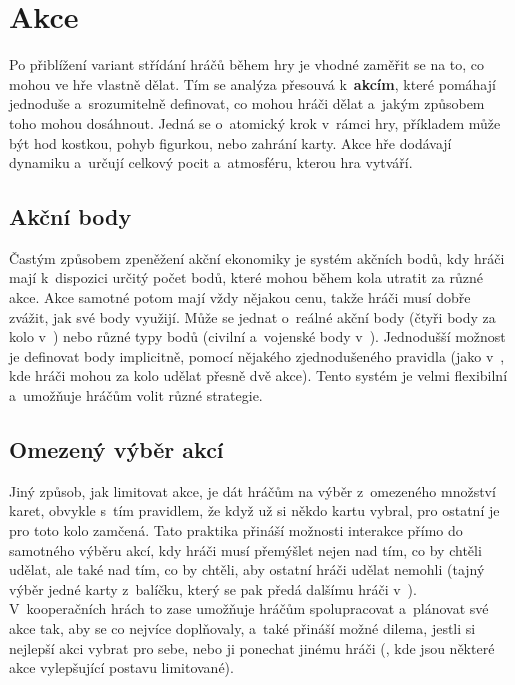 
\section{Akce}
\label{sec:actions}

Po přiblížení variant střídání hráčů během hry je vhodné zaměřit se na to, co mohou ve hře vlastně dělat. Tím se analýza přesouvá k~\textbf{akcím}, které pomáhají jednoduše a~srozumitelně definovat, co mohou hráči dělat a~jakým způsobem toho mohou dosáhnout. Jedná se o~atomický krok v~rámci hry, příkladem může být hod kostkou, pohyb figurkou, nebo zahrání karty. Akce hře dodávají dynamiku a~určují celkový pocit a~atmosféru, kterou hra vytváří.

\subsection{Akční body}
\label{subsec:actions_action_points}

Častým způsobem zpeněžení akční ekonomiky je systém akčních bodů, kdy hráči mají k~dispozici určitý počet bodů, které mohou během kola utratit za různé akce. Akce samotné potom mají vždy nějakou cenu, takže hráči musí dobře zvážit, jak své body využijí. Může se jednat o~reálné akční body (čtyři body za kolo v~) nebo různé typy bodů (civilní a~vojenské body v~). Jednodušší možnost je definovat body implicitně, pomocí nějakého zjednodušeného pravidla (jako v~, kde hráči mohou za kolo udělat přesně dvě akce). Tento systém je velmi flexibilní a~umožňuje hráčům volit různé strategie.

\subsection{Omezený výběr akcí}
\label{subsec:actions_limited_actions}

Jiný způsob, jak limitovat akce, je dát hráčům na výběr z~omezeného množství karet, obvykle s~tím pravidlem, že když už si někdo kartu vybral, pro ostatní je pro toto kolo zamčená. Tato praktika přináší možnosti interakce přímo do samotného výběru akcí, kdy hráči musí přemýšlet nejen nad tím, co by chtěli udělat, ale také nad tím, co by chtěli, aby ostatní hráči udělat nemohli (tajný výběr jedné karty z~balíčku, který se pak předá dalšímu hráči v~). V~kooperačních hrách to zase umožňuje hráčům spolupracovat a~plánovat své akce tak, aby se co nejvíce doplňovaly, a~také přináší možné dilema, jestli si nejlepší akci vybrat pro sebe, nebo ji ponechat jinému hráči (, kde jsou některé akce vylepšující postavu limitované).

